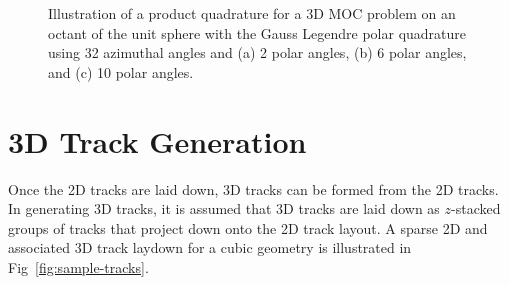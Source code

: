 \begin{figure}[h!]
\begin{subfigure}{0.3\textwidth}
		\caption{}
		\label{fig:quad-unit-sphere-c}
	\end{subfigure}
	\caption[]{Illustration of a product quadrature for a 3D MOC problem on an octant of the unit sphere with the Gauss Legendre polar quadrature using 32 azimuthal angles and (a) 2 polar angles, (b) 6 polar angles, and (c) 10 polar angles.}
	\label{fig:quad-unit-sphere}
\end{figure}


\section{3D Track Generation}
\label{sec:laydown-3D}

Once the 2D tracks are laid down, 3D tracks can be formed from the 2D tracks. In generating 3D tracks, it is assumed that 3D tracks are laid down as $z$-stacked groups of tracks that project down onto the 2D track layout. A sparse 2D and associated 3D track laydown for a cubic geometry is illustrated in Fig~\ref{fig:sample-tracks}.

